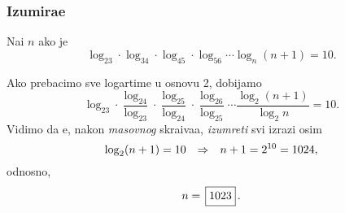 \subsubsection{Izumira{\nj}e}

\zadatak Na{\dj}i $n$ ako je
$$
\log_23\cdot\log_34\cdot\log_45\cdot\log_56\cdots\log_n(n+1)=10.
$$

\resenje
Ako prebacimo sve logartime u osnovu 2, dobijamo
$$
\log_23
\cdot\frac{\log_24}{\log_23}
\cdot\frac{\log_25}{\log_24}
\cdot\frac{\log_26}{\log_25}
\cdots\frac{\log_2(n+1)}{\log_2n}=10.
$$
Vidimo da {\cc}e, nakon {\sl masovnog\/} skra{\cc}iva{\nj}a, {\sl izumreti\/} svi izrazi osim
$$
\log_2(n+1)=10{\quad\Rightarrow\quad} n+1 = 2^{10}=1024,
$$
odnosno,
$$
n=\ram{1023}.
$$
